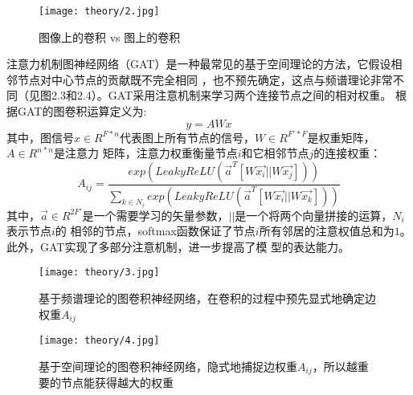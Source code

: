 \begin{figure}[ht]
    \centering
    \texttt{[image: theory/2.jpg]}
    \caption{\label{2-2}图像上的卷积 vs 图上的卷积}
\end{figure}

注意力机制图神经网络（GAT）是一种最常见的基于空间理论的方法，它假设相邻节点对中心节点的贡献既不完全相同
，也不预先确定，这点与频谱理论非常不同（见图2.3和2.4）。GAT采用注意机制来学习两个连接节点之间的相对权重。
根据GAT的图卷积运算定义为:
$$  y = A W x $$
其中，图信号$ x\in R^{F*n} $代表图上所有节点的信号，$ W \in R^{F'*F} $是权重矩阵，$A \in R^{n*n}$是注意力
矩阵，注意力权重衡量节点$i$和它相邻节点$j$的连接权重：
$$
    A_{ij} = \frac{exp(LeakyReLU(\vec{a}^{T}[W\vec{x_{i}}||W\vec{x_{j}}]))}
    { {\textstyle \sum_{k\in N_{i} }^{}} exp(LeakyReLU(\vec{a}^{T}[W\vec{x_{i}}||W\vec{x_{k}}]))}  
$$
其中，$\vec{a} \in R^{2F'}$是一个需要学习的矢量参数，$ || $是一个将两个向量拼接的运算，$ N_{i} $表示节点$i$的
相邻的节点，softmax函数保证了节点$i$所有邻居的注意权值总和为$1$。此外，GAT实现了多部分注意机制，进一步提高了模
型的表达能力。

\begin{figure}[htbp]
    \centering
    \begin{minipage}[t]{0.48\textwidth}
    \centering
    \captionsetup{width=5cm}
    \texttt{[image: theory/3.jpg]}
    \caption{\label{2-3}基于频谱理论的图卷积神经网络，在卷积的过程中预先显式地确定边权重$A_{ij}$}
    \end{minipage}
    \begin{minipage}[t]{0.48\textwidth}
    \centering
    \captionsetup{width=5cm}
    \texttt{[image: theory/4.jpg]}
    \caption{\label{2-4}基于空间理论的图卷积神经网络，隐式地捕捉边权重$A_{ij}$，所以越重要的节点能获得越大的权重}
    \end{minipage}
\end{figure}

